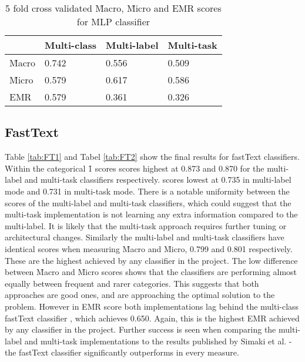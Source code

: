 \documentclass[Dissertation.tex]{subfiles}
\begin{document}
\begin{table}[]
	\centering
	\caption{5 fold cross validated \f{Macro}, \f{Micro} and EMR scores for MLP classifier}
			\label{tab:MLP2}
	\begin{tabular}{@{}llll@{}}
		\toprule
		& Multi-class & Multi-label & Multi-task \\ \midrule
		\f{Macro} & 0.742       & 0.556       & 0.509      \\
		\f{Micro} & 0.579       & 0.617       & 0.586      \\
		EMR       & 0.579       & 0.361       & 0.326      \\ \bottomrule
	\end{tabular}
\end{table}
\subsection{FastText}
Table \ref{tab:FT1} and Tabel \ref{tab:FT2} show the final results for fastText classifiers. Within the categorical \f{1} scores  scores highest at 0.873 and 0.870 for the multi-label and multi-task classifiers respectively.  scores lowest at 0.735 in multi-label mode and 0.731 in multi-task mode. There is a notable uniformity between the scores of the multi-label and multi-task classifiers, which could suggest that the multi-task implementation is not learning any extra information compared to the multi-label. It is likely that the multi-task approach requires further tuning or architectural changes. Similarly the multi-label and multi-task classifiers have identical scores when measuring \f{Macro} and \f{Micro}, 0.799 and 0.801 respectively. These are the highest achieved by any classifier in the project. The low difference between \f{Macro} and \f{Micro} scores shows that the classifiers are performing almost equally between frequent and rarer categories. This suggests that both approaches are good ones, and are approaching the optimal solution to the problem. However in EMR score both implementations lag behind the multi-class fastText classifier , which achieves 0.650. Again, this is the highest EMR achieved by any classifier in the project. Further success is seen when comparing the multi-label and multi-task implementations to the results published by Simaki et al. \cite{simakiStanceClassificationTexts2017} - the fastText classifier significantly outperforms in every measure.
\end{document}
